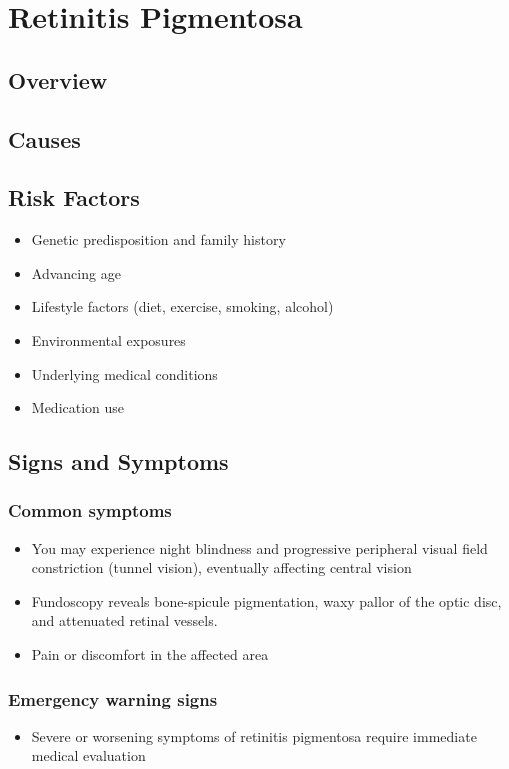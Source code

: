 \chapter{Retinitis Pigmentosa}
\label{sec:Retinitis Pigmentosa}

\section{Overview}

\section{Causes}
\section{Risk Factors}

\begin{itemize}[noitemsep]
  \item Genetic predisposition and family history
  \item Advancing age
  \item Lifestyle factors (diet, exercise, smoking, alcohol)
  \item Environmental exposures
  \item Underlying medical conditions
  \item Medication use
\end{itemize}
\section{Signs and Symptoms}

\subsection{Common symptoms}
\begin{itemize}[noitemsep]
  \item You may experience night blindness and progressive peripheral visual field constriction (tunnel vision), eventually affecting central vision
  \item Fundoscopy reveals bone-spicule pigmentation, waxy pallor of the optic disc, and attenuated retinal vessels.
  \item Pain or discomfort in the affected area
  \end{itemize}

\subsection{Emergency warning signs}
\begin{itemize}[noitemsep]
  \item Severe or worsening symptoms of retinitis pigmentosa require immediate medical evaluation
\end{itemize}
